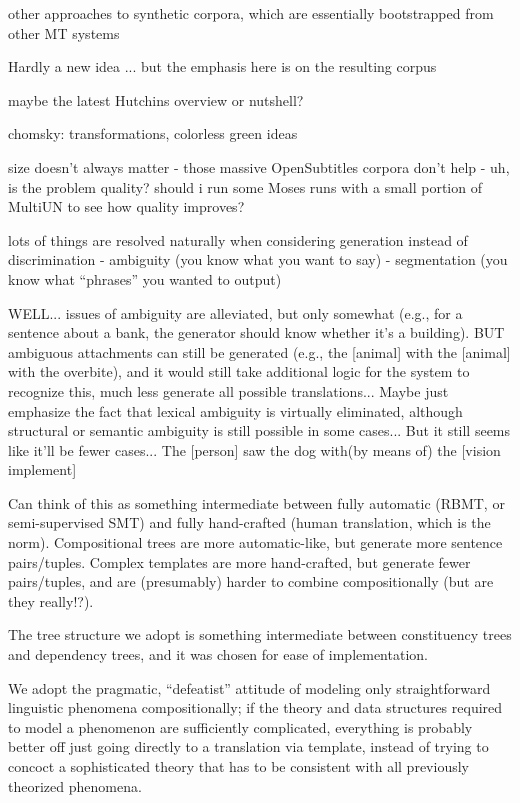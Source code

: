 other approaches to synthetic corpora, which are essentially bootstrapped from other MT systems

Hardly a new idea ... but the emphasis here is on the resulting corpus





maybe the latest Hutchins overview or nutshell?


chomsky: transformations, colorless green ideas


size doesn't always matter - those massive OpenSubtitles corpora don't help
- uh, is the problem quality? should i run some Moses runs with a small portion of MultiUN to see how quality improves?

lots of things are resolved naturally when considering generation instead of discrimination
- ambiguity (you know what you want to say)
- segmentation (you know what ``phrases'' you wanted to output)

WELL... issues of ambiguity are alleviated, but only somewhat (e.g., for a sentence about a bank, the generator should know whether it's a building). 
BUT ambiguous attachments can still be generated (e.g., the [animal] with the [animal] with the overbite), and it would still take additional logic for the system to recognize this, much less generate all possible translations...
Maybe just emphasize the fact that lexical ambiguity is virtually eliminated, although structural or semantic ambiguity is still possible in some cases...
But it still seems like it'll be fewer cases... The [person] saw the dog with(by means of) the [vision implement]


Can think of this as something intermediate between fully automatic (RBMT, or semi-supervised SMT) and fully hand-crafted (human translation, which is the norm).
Compositional trees are more automatic-like, but generate more sentence pairs/tuples.
Complex templates are more hand-crafted, but generate fewer pairs/tuples, and are (presumably) harder to combine compositionally (but are they really!?).

The tree structure we adopt is something intermediate between constituency trees and dependency trees, and it was chosen for ease of implementation.

We adopt the pragmatic, ``defeatist'' attitude of modeling only straightforward linguistic phenomena compositionally; if the theory and data structures required to model a phenomenon are sufficiently complicated, everything is probably better off just going directly to a translation via template, instead of trying to concoct a sophisticated theory that has to be consistent with all previously theorized phenomena.


